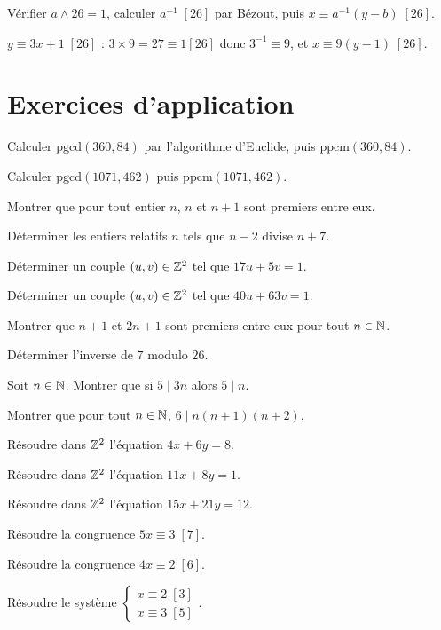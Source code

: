 Vérifier $a\wedge26=1$, calculer $a^{-1}\;[26]$ par Bézout, puis $x\equiv a^{-1}(y-b)\;[26]$.
\begin{exemple}
$y\equiv3x+1\;[26]$ : $3\times9=27\equiv1[26]$ donc $3^{-1}\equiv9$, et $x\equiv9(y-1)\;[26]$.
\end{exemple}

\section{Exercices d'application}

\exo{} Calculer $\mathrm{pgcd}(360,84)$ par l'algorithme d'Euclide, puis $\mathrm{ppcm}(360,84)$.

\exo{} Calculer $\mathrm{pgcd}(1071,462)$ puis $\mathrm{ppcm}(1071,462)$.

\exo{} Montrer que pour tout entier $n$, $n$ et $n+1$ sont premiers entre eux.

\exo{} Déterminer les entiers relatifs $n$ tels que $n-2$ divise $n+7$.

\exo{} Déterminer un couple $(u,v)\in\mathbb{Z}^2$ tel que $17u+5v=1$.

\exo{} Déterminer un couple $(u,v)\in\mathbb{Z}^2$ tel que $40u+63v=1$.

\exo{} Montrer que $n+1$ et $2n+1$ sont premiers entre eux pour tout $n\in\mathbb{N}$.

\exo{} Déterminer l'inverse de $7$ modulo $26$.

\exo{} Soit $n\in\mathbb{N}$. Montrer que si $5\mid 3n$ alors $5\mid n$.

\exo{} Montrer que pour tout $n\in\mathbb{N}$, $6\mid n(n+1)(n+2)$.

\exo{} Résoudre dans $\mathbb{Z}^2$ l'équation $4x+6y=8$.

\exo{} Résoudre dans $\mathbb{Z}^2$ l'équation $11x+8y=1$.

\exo{} Résoudre dans $\mathbb{Z}^2$ l'équation $15x+21y=12$.

\exo{} Résoudre la congruence $5x\equiv3\;[7]$.

\exo{} Résoudre la congruence $4x\equiv2\;[6]$.

\exo{} Résoudre le système $\begin{cases}x\equiv2\;[3]\\ x\equiv3\;[5]\end{cases}$.

